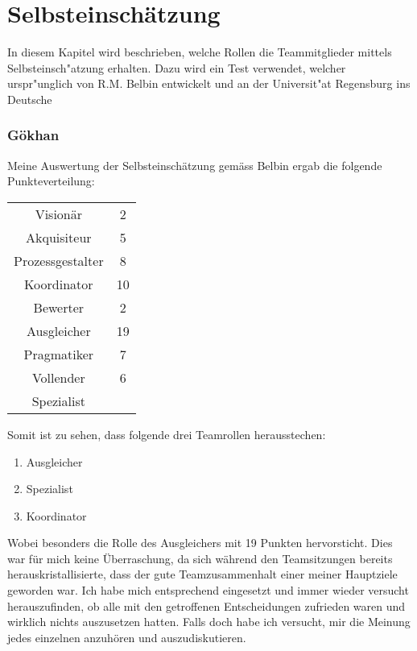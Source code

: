 
\chapter{Selbsteinschätzung}

In diesem Kapitel wird beschrieben, welche Rollen die Teammitglieder mittels Selbsteinsch"atzung erhalten. Dazu wird ein Test verwendet, welcher urspr"unglich von R.M. Belbin \cite{belbin1981management} entwickelt und an der Universit"at Regensburg ins Deutsche %

\subsection*{Gökhan}

Meine Auswertung der Selbsteinschätzung gemäss Belbin ergab die folgende Punkteverteilung:

\begin{tabular}{cc}
  Visionär & 2 \\ 
  Akquisiteur & 5 \\ 
  Prozessgestalter & 8 \\ 
  Koordinator & 10 \\ 
  Bewerter & 2 \\
  Ausgleicher & 19 \\
  Pragmatiker & 7 \\
  Vollender & 6 \\
  Spezialist & \\
\end{tabular}

\newline


Somit ist zu sehen, dass folgende drei Teamrollen herausstechen: \\
\begin{enumerate} 
\item Ausgleicher 
\item Spezialist
\item Koordinator
\end{enumerate}

Wobei besonders die Rolle des Ausgleichers mit 19 Punkten hervorsticht. Dies war für mich keine Überraschung, da sich während den Teamsitzungen bereits herauskristallisierte, dass der gute Teamzusammenhalt einer meiner Hauptziele geworden war. Ich habe mich entsprechend eingesetzt und immer wieder versucht herauszufinden, ob alle mit den getroffenen Entscheidungen zufrieden waren und wirklich nichts auszusetzen hatten. Falls doch habe ich versucht, mir die Meinung jedes einzelnen anzuhören und auszudiskutieren. 

